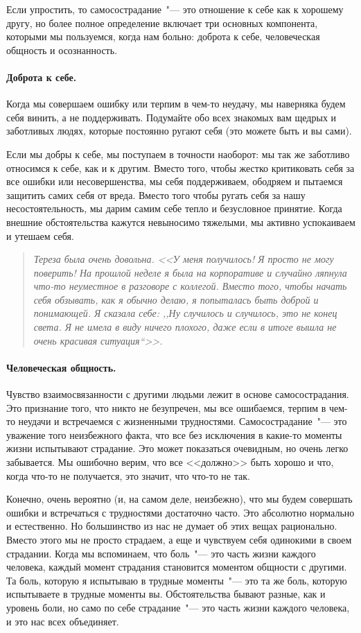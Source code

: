 Если упростить, то самосострадание~"--- это отношение к себе как к хорошему другу, но более полное определение включает три основных компонента, которыми мы пользуемся, когда нам больно: доброта к себе, человеческая общность и осознанность.

\paragraph{Доброта к себе.} 
Когда мы совершаем ошибку или терпим в чем-то неудачу, мы наверняка будем себя винить, а не поддерживать. Подумайте обо всех знакомых вам щедрых и заботливых людях, которые постоянно ругают себя (это можете быть и вы сами). 

Если мы добры к себе, мы поступаем в точности наоборот: мы так же заботливо относимся к себе, как и к другим. Вместо того, чтобы жестко критиковать себя за все ошибки или несовершенства, мы себя поддерживаем, ободряем и пытаемся защитить самих себя от вреда. Вместо того чтобы ругать себя за нашу несостоятельность, мы дарим самим себе тепло и безусловное принятие. Когда внешние обстоятельства кажутся невыносимо тяжелыми, мы активно успокаиваем и утешаем себя. 

\begin{quote}
	\textit{Тереза была очень довольна. <<У меня получилось! Я просто не могу поверить! На прошлой неделе я была на корпоративе и случайно ляпнула  что-то неуместное в разговоре с коллегой. Вместо того, чтобы начать себя обзывать, как я обычно делаю, я попыталась быть доброй и понимающей. Я сказала себе: ,,Ну случилось и случилось, это не конец света. Я не имела в виду ничего плохого, даже если в итоге вышла не очень красивая ситуация``>>.}
\end{quote}

\paragraph{Человеческая общность.}
 Чувство взаимосвязанности с другими людьми лежит в основе самосострадания. Это признание того, что никто не безупречен, мы все ошибаемся, терпим в чем-то неудачи и встречаемся с жизненными трудностями. Самосострадание~"--- это уважение того неизбежного факта, что все без исключения в какие-то моменты жизни испытывают страдание. Это может показаться очевидным, но очень легко забывается. Мы ошибочно верим, что все <<должно>> быть хорошо и что, когда что-то не получается, это значит, что что-то не так. 

Конечно, очень вероятно (и, на самом деле, неизбежно), что мы будем совершать ошибки и встречаться с трудностями достаточно часто. Это абсолютно нормально и естественно. Но большинство из нас не думает об этих вещах рационально. Вместо этого мы не просто страдаем, а еще и чувствуем себя одинокими в своем страдании. Когда мы вспоминаем, что боль~"--- это часть жизни каждого человека, каждый момент страдания становится моментом общности с другими. Та боль, которую я испытываю в трудные моменты~"--- это та же боль, которую испытываете в трудные моменты вы. Обстоятельства бывают разные, как и уровень боли, но само по себе страдание~"--- это часть жизни каждого человека, и это нас всех объединяет. 

